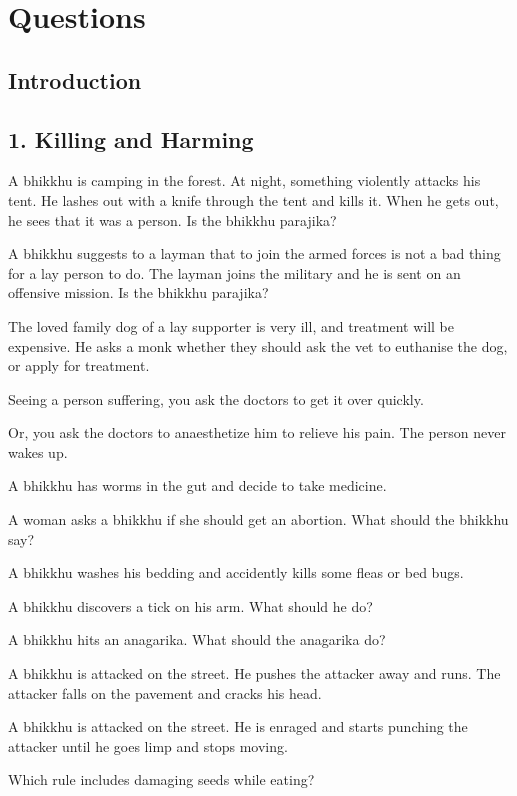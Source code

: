 \chapter{Questions}

\section{Introduction}

\section{1. Killing and Harming}

A bhikkhu is camping in the forest. At night, something violently
attacks his tent. He lashes out with a knife through the tent and kills
it. When he gets out, he sees that it was a person. Is the bhikkhu
parajika?

A bhikkhu suggests to a layman that to join the armed forces is not a
bad thing for a lay person to do. The layman joins the military and he
is sent on an offensive mission. Is the bhikkhu parajika?

The loved family dog of a lay supporter is very ill, and treatment will
be expensive. He asks a monk whether they should ask the vet to
euthanise the dog, or apply for treatment.

Seeing a person suffering, you ask the doctors to get it over quickly.

Or, you ask the doctors to anaesthetize him to relieve his pain. The
person never wakes up.

A bhikkhu has worms in the gut and decide to take medicine.

A woman asks a bhikkhu if she should get an abortion. What should the
bhikkhu say?

A bhikkhu washes his bedding and accidently kills some fleas or bed
bugs.

A bhikkhu discovers a tick on his arm. What should he do?

A bhikkhu hits an anagarika. What should the anagarika do?

A bhikkhu is attacked on the street. He pushes the attacker away and
runs. The attacker falls on the pavement and cracks his head.

A bhikkhu is attacked on the street. He is enraged and starts punching
the attacker until he goes limp and stops moving.

Which rule includes damaging seeds while eating?


